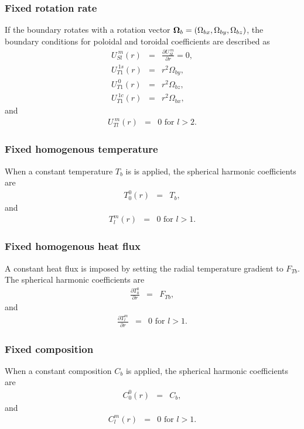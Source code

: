 \subsubsection{Fixed rotation rate}
If the boundary rotates with a rotation vector $\mbox{\boldmath$\Omega$}_{b} = \left(\Omega_{bx}, \Omega_{by}, \Omega_{bz}\right)$, the boundary conditions for poloidal and toroidal coefficients are described as
%
\begin{eqnarray}
U_{Sl}^{\ m}(r) & = & \frac{\partial U_{Sl}^{\ m}}{\partial r} = 0,
\nonumber \\
U_{T1}^{\ 1s}(r) & = & r^{2} \Omega_{by},
\nonumber \\
U_{T1}^{\ 0}(r) & = &  r^{2} \Omega_{bz},
\nonumber \\
U_{T1}^{\ 1c}(r) & = & r^{2} \Omega_{bx},
\nonumber
\end{eqnarray}
%
and 
%
\begin{eqnarray}
U_{Tl}^{\ m}(r) & = & 0 \mbox{ for } l > 2.
\nonumber
\end{eqnarray}
%
\subsubsection{Fixed homogenous temperature}
When a constant temperature $T_{b}$ is is applied, the spherical harmonic coefficients are
%
\begin{eqnarray}
T_{0}^{0}(r) & = &  T_{b},
\nonumber
\end{eqnarray}
%
and 
%
\begin{eqnarray}
T_{l}^{m}(r) & = & 0 \mbox{ for } l > 1.
\nonumber
\end{eqnarray}
%
\subsubsection{Fixed homogenous heat flux}
A constant heat flux is imposed by setting the radial temperature gradient to $F_{Tb}$. The spherical harmonic coefficients are
%
\begin{eqnarray}
\frac{\partial T_{0}^{0}}{\partial r} & = &  F_{Tb},
\nonumber
\end{eqnarray}
%
and 
%
\begin{eqnarray}
\frac{\partial T_{l}^{m}}{\partial r} & = & 0 \mbox{ for } l > 1.
\nonumber
\end{eqnarray}
%
\subsubsection{Fixed composition}
When a constant composition $C_{b}$ is applied, the spherical harmonic coefficients are 
%
\begin{eqnarray}
C_{0}^{0}(r) & = & C_{b},
\nonumber
\end{eqnarray}
%
and 
%
\begin{eqnarray}
C_{l}^{m}(r) & = & 0 \mbox{ for } l > 1.
\nonumber
\end{eqnarray}
%
